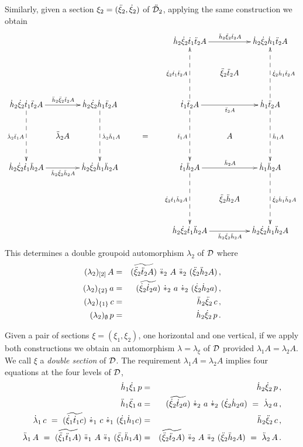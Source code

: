 \medskip\noindent
Similarly, given a section $\xi_2 = (\ddot{\xi}_2,\dot{\xi}_2)$ of $\ddot{\mathcal{D}}_2$, 
applying the same construction we obtain
$$
\xymatrix @C=0.8pc @R=2pc{
 & & & & & & \dhht\dxt\dtto\ddttt A 
             \ar[rr]^{\ddhht\ddxt\ddttt A} 
             & & \dhht\dxt\dhho\ddttt A \\
 & & & & & & & \ddxt\ddttt A 
               & \\
\dhht\dxt\dtto\ddttt A 
\ar[rr]^{\ddhht\ddxt\ddttt A} 
\ar@{-->}[dd]_{\dlt\ddtto A} 
 & & \dhht\dxt\dhho\ddttt A 
     \ar@{-->}[dd]^{\dlt\ddhho A}
     & & & & \dtto\ddttt A 
             \ar[rr]_{\ddttt A} 
             \ar@{-->}[dd]_{\ddtto A} 
             \ar@{-->}[uu]^{\dxt\dtto\ddttt A} 
             & & \dhho\ddttt A 
                 \ar@{-->}[dd]^{\ddhho A} 
                 \ar@{-->}[uu]_{\dxt\dhho\ddttt A}\\
 & \ddlt A 
   & & & = 
         & & & A 
               & \\ 
\dhht\dxt\dtto\ddhht A 
\ar[rr]_{\ddhht\ddxt\ddhht A} 
 & & \dhht\dxt\dhho\ddhht A 
     & & & & \dtto\ddhht A 
             \ar[rr]^{\ddhht A} 
             \ar@{-->}[dd]_{\dxt\dtto\ddhht A} 
             & & \dhho\ddhht A 
                 \ar@{-->}[dd]^{\dxt\dhho\ddhht A}\\
 & & & & & & & \ddxt\ddhht A 
               & \\
 & & 
     & & & & \dhht\dxt\dtto\ddhht A 
             \ar[rr]_{\ddhht\ddxt\ddhht A} 
             & & \dhht\dxt\dhho\ddhht A \\
}
$$
This determines a double groupoid automorphism $\lambda_2$ of $\mathcal{D}$ where
\begin{eqnarray} \label{eq:lambdat}
(\lambda_2)_{[2]}\,A 
  &=& (\widetilde{\ddot{\xi}_2\ddot{t}_2 A}) ~\ddot{\ast}_2~ A ~\ddot{\ast}_2~ (\ddot{\xi}_2\ddot{h}_2 A)\,,\\
(\lambda_2)_{\{2\}}\,a 
  &=& (\widetilde{\dot{\xi}_2\dot{t}_2 a}) ~\dot{\ast}_2~ a ~\dot{\ast}_2~ (\dot{\xi}_2\dot{h}_2 a)\,, \nonumber \\
(\lambda_2)_{\{1\}}\,c 
  &=& \ddot{h}_2\ddot{\xi}_2\,c\,, \nonumber \\
(\lambda_2)_{\emptyset}\,p 
  &=& \dot{h}_2\dot{\xi}_2\,p\,. \nonumber
\end{eqnarray}

\bigskip
Given a pair of sections $\xi = (\xi_1,\xi_2)$, 
one horizontal and one vertical, 
if we apply both constructions we obtain an automorphism 
$\lambda = \lambda_{\xi}$ of $\mathcal{D}$ 
provided $\lambda_1 A = \lambda_2 A$.
We call $\xi$ a \emph{double section} of $\mathcal{D}$.
The requirement  $\lambda_1 A = \lambda_2 A$  implies
four equations at the four levels of $\mathcal{D}$, 
\begin{eqnarray*}
\dot{h}_1\dot{\xi}_1\,p
  &=&  \dot{h}_2\dot{\xi}_2\,p\,, \\
\ddot{h}_1\ddot{\xi}_1\,a
  &=&  (\widetilde{\dot{\xi}_2\dot{t}_2 a}) ~\dot{\ast}_2~ a ~\dot{\ast}_2~ (\dot{\xi}_2\dot{h}_2 a)
      ~=~ \dot{\lambda}_2\,a\,, \\
\dot{\lambda}_1\,c ~=~  (\widetilde{\dot{\xi}_1\dot{t}_1 c}) ~\dot{\ast}_1~ c ~\dot{\ast}_1~ (\dot{\xi}_1\dot{h}_1 c)
  &=&  \ddot{h}_2\ddot{\xi}_2\,c\,, \\
\ddot{\lambda}_1\,A ~=~ (\widetilde{\ddot{\xi}_1\ddot{t}_1 A}) ~\ddot{\ast}_1~ A ~\ddot{\ast}_1~ (\ddot{\xi}_1\ddot{h}_1 A) 
  &=&  (\widetilde{\ddot{\xi}_2\ddot{t}_2 A}) ~\ddot{\ast}_2~ A ~\ddot{\ast}_2~ (\ddot{\xi}_2\ddot{h}_2 A)
       ~=~ \ddot{\lambda}_2\,A\,.
\end{eqnarray*}


